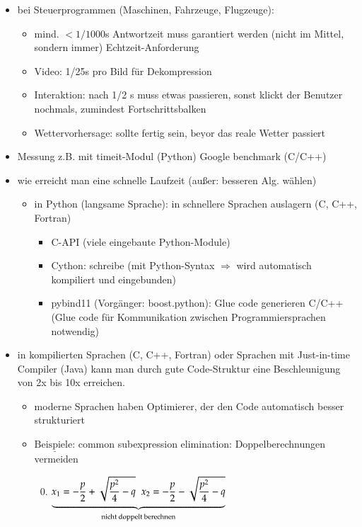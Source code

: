 \documentclass[11pt, fleqn]{scrreprt}
\begin{document}
	\begin{itemize}
		\item bei Steuerprogrammen (Maschinen, Fahrzeuge, Flugzeuge):
		\begin{itemize}
			\item mind. $< 1/1000$s Antwortzeit muss garantiert werden (nicht im Mittel, sondern immer) \glqq Echtzeit-Anforderung\grqq
			\item Video: 1/25s pro Bild für Dekompression
			\item Interaktion: nach 1/2 s muss etwas passieren, sonst klickt der Benutzer nochmals, zumindest Fortschrittsbalken
			\item Wettervorhersage: sollte fertig sein, $\underline{\text{bevor}}$ das reale Wetter passiert
		\end{itemize}
		\item Messung z.B. mit timeit-Modul (Python) Google benchmark (C/C++)
		\item wie erreicht man eine schnelle Laufzeit (außer: besseren Alg. wählen)
		\begin{itemize}
			\item in Python (langsame Sprache): in schnellere Sprachen auslagern (C, C++, Fortran)
			\begin{itemize}
				\item C-API (viele eingebaute Python-Module)
				\item Cython: schreibe (mit Python-Syntax $\Rightarrow$ wird automatisch kompiliert und eingebunden)
				\item pybind11 (Vorgänger: boost.python): Glue code generieren C/C++ (Glue code für Kommunikation zwischen Programmiersprachen notwendig)
			\end{itemize}
		\end{itemize}
		\item in kompilierten Sprachen (C, C++, Fortran) oder Sprachen mit Just-in-time Compiler (Java) kann man durch gute Code-Struktur eine Beschleunigung von 2x bis 10x erreichen.
		\begin{itemize}
			\item moderne Sprachen haben \glqq Optimierer\grqq , der den Code automatisch besser strukturiert
			\item $\underline{\text{Beispiele:}}$ \glqq common subexpression elimination\grqq : Doppelberechnungen vermeiden \\
			\begin{enumerate}
				\setcounter{enumi}{-1}
				\item $\underbrace{ x_1= -\frac{p}{2} + \sqrt{\frac{p^2}{4} - q}\hspace*{2mm}x_2= -\frac{p}{2} - \sqrt{\frac{p^2}{4} -q}}_{\text{nicht doppelt berechnen}}$

\end{enumerate}
\end{itemize}
\end{itemize}
\end{document}

